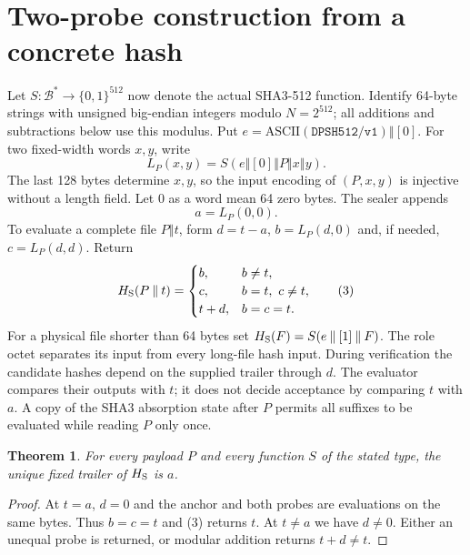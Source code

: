 \documentclass[10pt,twocolumn,letterpaper]{article}
\newtheorem{theorem}{Theorem}
\newcommand{\cat}{\mathbin\Vert}
\newcommand{\bits}{\{0,1\}}
\newcommand{\B}{\mathcal B}
\begin{document}
\section{Two-probe construction from a concrete hash}
Let \(S:\B^*\to\bits^{512}\) now denote the actual SHA3-512 function. Identify 64-byte strings with unsigned big-endian integers modulo \(N=2^{512}\); all additions and subtractions below use this modulus. Put \(e=\text{ASCII}(\texttt{DPSH512/v1})\cat[0]\). For two fixed-width words \(x,y\), write
\[
       L_P(x,y)=S(e\cat[0]\cat P\cat x\cat y).
\]
The last 128 bytes determine \(x,y\), so the input encoding of \((P,x,y)\) is injective without a length field. Let \(0\) as a word mean 64 zero bytes. The sealer appends
\[
                         a=L_P(0,0).
\]
To evaluate a complete file \(P\cat t\), form \(d=t-a\), \(b=L_P(d,0)\) and, if needed, \(c=L_P(d,d)\). Return
\[
 H_{\rm S}(P\cat t)=
 \begin{cases}
 b, & b\ne t,\\
 c, & b=t,\ c\ne t,\\
 t+d, & b=c=t .
 \end{cases}                                                   \tag{3}
\]
For a physical file shorter than 64 bytes set \(H_{\rm S}(F)=S(e\cat[1]\cat F)\). The role octet separates its input from every long-file hash input. During verification the candidate hashes depend on the supplied trailer through \(d\). The evaluator compares their outputs with \(t\); it does not decide acceptance by comparing \(t\) with \(a\). A copy of the SHA3 absorption state after \(P\) permits all suffixes to be evaluated while reading \(P\) only once.

\begin{theorem}
For every payload \(P\) and every function \(S\) of the stated type, the unique fixed trailer of \(H_{\rm S}\) is \(a\).
\end{theorem}
\begin{proof}
At \(t=a\), \(d=0\) and the anchor and both probes are evaluations on the same bytes. Thus \(b=c=t\) and (3) returns \(t\). At \(t\ne a\) we have \(d\ne0\). Either an unequal probe is returned, or modular addition returns \(t+d\ne t\).
\end{proof}
\end{document}
